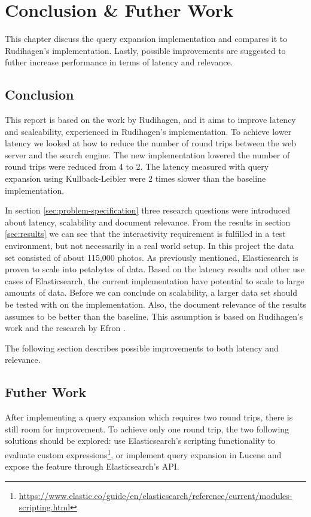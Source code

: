 \chapter{Conclusion \& Futher Work}
\label{ch:conclusion}
This chapter discuss the query expansion implementation and compares it to Rudihagen's implementation.
Lastly, possible improvements are suggested to futher increase performance in terms of latency and relevance.

\section{Conclusion}
This report is based on the work by Rudihagen, and it aims to improve latency and scaleability, experienced in Rudihagen's implementation.
To achieve lower latency we looked at how to reduce the number of round trips between the web server and the search engine.
The new implementation lowered the number of round trips were reduced from 4 to 2.
The latency measured with query expansion using Kullback-Leibler were 2 times slower than the baseline implementation.

In section \ref{sec:problem-specification} three research questions were introduced about latency, scalability and document relevance.
From the results in section \ref{sec:results} we can see that the interactivity requirement is fulfilled in a test environment,
but not necessarily in a real world setup.
In this project the data set consisted of about 115,000 photos.
As previously mentioned, Elasticsearch is proven to scale into petabytes of data.
Based on the latency results and other use cases of Elasticsearch,
the current implementation have potential to scale to large amounts of data.
Before we can conclude on scalability, a larger data set should be tested with on the implementation.
Also, the document relevance of the results assumes to be better than the baseline.
This assumption is based on Rudihagen's work and the research by Efron \cite{ir-hashtag}.

The following section describes possible improvements to both latency and relevance.

\section{Futher Work}
After implementing a query expansion which requires two round trips, there is still room for improvement.
To achieve only one round trip, the two following solutions should be explored:
use Elasticsearch's scripting functionality to evaluate custom expressions\footnote{\url{https://www.elastic.co/guide/en/elasticsearch/reference/current/modules-scripting.html}},
or implement query expansion in Lucene and expose the feature through Elasticsearch's API.

